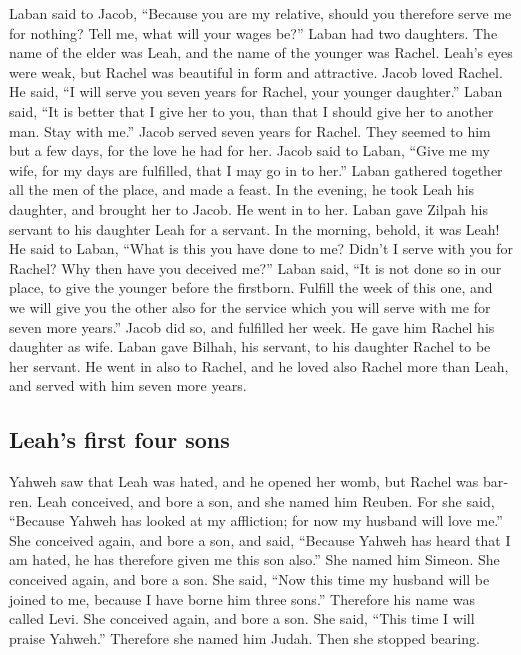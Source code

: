 \begin{paracol}{2}
\begin{otherlanguage}{english}
 Laban said to Jacob, ``Because you are my relative,
should you therefore serve me for nothing? Tell me, what will your wages
be?''  Laban had two daughters. The name of the elder was
Leah, and the name of the younger was Rachel.  Leah's
eyes were weak, but Rachel was beautiful in form and attractive.
 Jacob loved Rachel. He said, ``I will serve you seven
years for Rachel, your younger daughter.''  Laban said,
``It is better that I give her to you, than that I should give her to
another man. Stay with me.''  Jacob served seven years
for Rachel. They seemed to him but a few days, for the love he had for
her.  Jacob said to Laban, ``Give me my wife, for my days
are fulfilled, that I may go in to her.''  Laban gathered
together all the men of the place, and made a feast.  In
the evening, he took Leah his daughter, and brought her to Jacob. He
went in to her.  Laban gave Zilpah his servant to his
daughter Leah for a servant.  In the morning, behold, it
was Leah! He said to Laban, ``What is this you have done to me? Didn't I
serve with you for Rachel? Why then have you deceived me?''
 Laban said, ``It is not done so in our place, to give
the younger before the firstborn.  Fulfill the week of
this one, and we will give you the other also for the service which you
will serve with me for seven more years.''  Jacob did so,
and fulfilled her week. He gave him Rachel his daughter as wife.
 Laban gave Bilhah, his servant, to his daughter Rachel
to be her servant.  He went in also to Rachel, and he
loved also Rachel more than Leah, and served with him seven more years.

\hypertarget{leahs-first-four-sons}{%
\subsection{Leah's first four sons}\label{leahs-first-four-sons}}

 Yahweh saw that Leah was hated, and he opened her womb,
but Rachel was barren.  Leah conceived, and bore a son,
and she named him Reuben. For she said, ``Because Yahweh has looked at
my affliction; for now my husband will love me.''  She
conceived again, and bore a son, and said, ``Because Yahweh has heard
that I am hated, he has therefore given me this son also.'' She named
him Simeon.  She conceived again, and bore a son. She
said, ``Now this time my husband will be joined to me, because I have
borne him three sons.'' Therefore his name was called Levi.
 She conceived again, and bore a son. She said, ``This
time I will praise Yahweh.'' Therefore she named him Judah. Then she
stopped bearing.


\end{otherlanguage}
\end{paracol}

